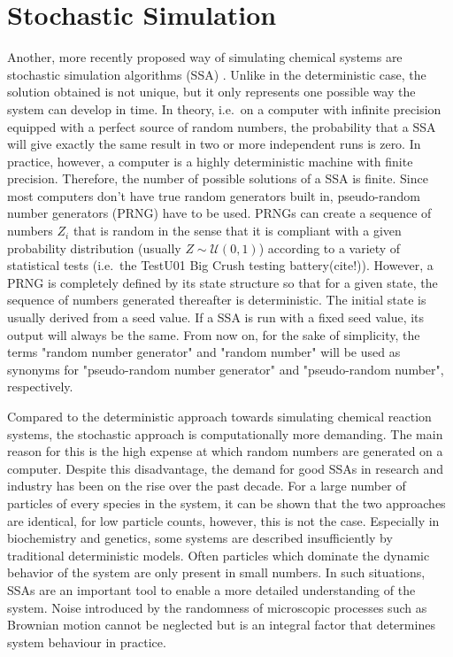 \section{Stochastic Simulation}
\label{ch:stochsim}
Another, more recently proposed way of simulating chemical systems are stochastic simulation algorithms (SSA) \cite{gillespie_general_1976}. Unlike in the deterministic case, the solution obtained is not unique, but it only represents one possible way the system can develop in time. In theory, i.e.\ on a computer with infinite precision equipped with a perfect source of random numbers, the probability that a SSA will give exactly the same result in two or more independent runs is zero. In practice, however, a computer is a highly deterministic machine with finite precision. Therefore, the number of possible solutions of a SSA is finite. Since most computers don't have true random generators built in, pseudo-random number generators (PRNG) have to be used. PRNGs can create a sequence of numbers $Z_i$ that is random in the sense that it is compliant with a given probability distribution (usually $Z \sim \mathcal{U}(0,1)$) according to a variety of statistical tests (i.e.\ the TestU01 Big Crush testing battery(cite!)). However, a PRNG is completely defined by its state structure so that for a given state, the sequence of numbers generated thereafter is deterministic. The initial state is usually derived from a seed value. If a SSA is run with a fixed seed value, its output will always be the same. From now on, for the sake of simplicity, the terms "random number generator" and "random number" will be used as synonyms for "pseudo-random number generator" and "pseudo-random number", respectively. 

Compared to the deterministic approach towards simulating chemical reaction systems, the stochastic approach is computationally more demanding. The main reason for this is the high expense at which random numbers are generated on a computer. Despite this disadvantage, the demand for good SSAs in research and industry has been on the rise over the past decade. For a large number of particles of every species in the system, it can be shown that the two approaches are identical, for low particle counts, however, this is not the case. Especially in biochemistry and genetics, some systems are described insufficiently by traditional deterministic models. Often particles which dominate the dynamic behavior of the system are only present in small numbers. In such situations, SSAs are an important tool to enable a more detailed understanding of the system. Noise introduced by the randomness of microscopic processes such as Brownian motion cannot be neglected but is an integral factor that determines system behaviour in practice. 

